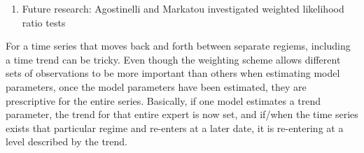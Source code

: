 \documentclass[12pt]{article}
\begin{document}

\begin{enumerate}
\item Future research: Agostinelli and Markatou \cite{AgostinelliMarkatou} investigated weighted likelihood ratio tests
\end{enumerate}

For a time series that moves back and forth between separate regiems, including a time trend can be tricky. Even though the weighting scheme allows different sets of observations to be more important than others when estimating model parameters, once the model parameters have been estimated, they are prescriptive for the entire series. Basically, if one model estimates a trend parameter, the trend for that entire expert is now set, and if/when the time series exists that particular regime and re-enters at a later date, it is re-entering at a level described by the trend.
\end{document}
